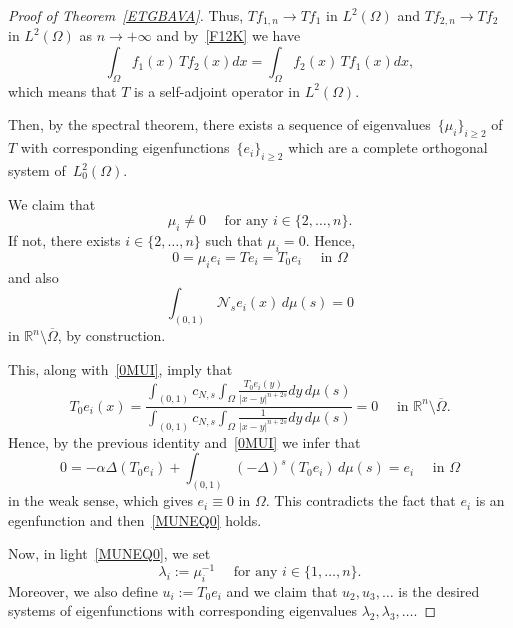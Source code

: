 \documentclass[12pt,a4paper,intlimits,sumlimits]{amsart}
\def \R {\mathbb{R}}
\def \Ns {\mathscr{N}_{s}}
\theoremstyle{definition}
\theoremstyle{plain}
\numberwithin{equation}{section}
\renewcommand{\ge}{\geqslant}
\begin{document}
\begin{proof}[Proof of Theorem~\ref{ETGBAVA}]
Thus, $T f_{1, n}\to T f_1$ in $L^2(\Omega)$ and $T f_{2, n}\to T f_2$ in $L^2(\Omega)$ as $n\to +\infty$ and by~\eqref{F12K} we have
\[
\int_\Omega f_1 (x) \, T f_2(x) dx = \int_\Omega f_2(x) \, T f_1(x) dx,
\]
which means that $T$ is a self-adjoint operator in $L^2(\Omega)$.

Then, by the spectral theorem, there exists a sequence of eigenvalues~$\{\mu_i\}_{i\ge 2}$ of~$T$ with corresponding eigenfunctions~$\{e_i\}_{i\ge 2}$ which are a complete orthogonal system of~$L_0^2(\Omega)$.

We claim that
\begin{equation}\label{MUNEQ0}
\mu_i \neq 0 \quad\mbox{ for any } i\in\{2,\dots, n\}.
\end{equation}
If not, there exists $i\in\{2, \dots, n\}$ such that $\mu_i=0$. Hence,
\begin{equation}\label{0MUI}
0=\mu_i e_i = T e_i = T_0 e_i \quad\text{ in } \Omega
\end{equation}
and also 
\[
\int_{(0,1)} \Ns e_i(x)\,d\mu(s)=0 
\]
in $\R^n\setminus\overline{\Omega}$, by construction. 

This, along with~\eqref{0MUI}, imply that
\[
T_0 e_i(x) =\frac{\displaystyle \int_{(0, 1)}c_{N,s}\int_\Omega \frac{T_0 e_i(y)}{|x-y|^{n+2s}} dy \, d\mu(s)}{\displaystyle \int_{(0, 1)}c_{N,s}\int_\Omega \frac{1}{|x-y|^{n+2s}} dy\, d\mu(s)} =0 \quad\text{ in } \R^n\setminus\overline{\Omega}.
\]
Hence, by the previous identity and~\eqref{0MUI} we infer that
\[
0= -\alpha \Delta (T_0 e_i) + \int_{(0, 1)} (-\Delta)^s (T_0 e_i)\, d\mu(s) =e_i \quad\mbox{ in } \Omega
\]
in the weak sense, which gives $e_i\equiv 0$ in $\Omega$. This contradicts the fact that $e_i$ is an egenfunction and then~\eqref{MUNEQ0} holds.

Now, in light~\eqref{MUNEQ0}, we set
\[
\lambda_i:= \mu_i^{-1} \quad\text{ for any } i\in\{1,\dots, n\}.
\]
Moreover, we also define $u_i:= T_0 e_i$ and we claim that $u_2, u_3, \dots$ is the desired systems of eigenfunctions with corresponding eigenvalues $\lambda_2, \lambda_3,\dots$.


\end{proof}
\end{document}
